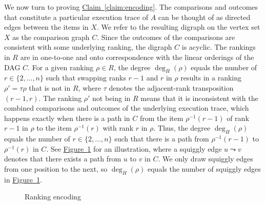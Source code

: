 \documentclass[11pt]{article}
\numberwithin{equation}{section}
\theoremstyle{definition}
\theoremstyle{plain}
\newcommand{\expref}[2]{\hyperref[#2]{#1~\ref{#2}}}
\newcommand{\ranking}{\rho}
\newcommand{\transposition}{\tau}
\begin{document}
We now turn to proving \expref{Claim}{claim:encoding}. The comparisons and outcomes that constitute a particular execution trace of $A$ can be thought of as directed edges between the items in $X$. We refer to the resulting digraph on the vertex set $X$ as the comparison graph $C$. Since the outcomes of the comparisons are consistent with some underlying ranking, the digraph $C$ is acyclic. The rankings in $R$ are in one-to-one and onto correspondence with the linear orderings of the DAG $C$. For a given ranking $\ranking \in R$, the degree $\deg_{\overline{H}}(\ranking)$ equals the number of $r \in \{2,\dots,n\}$ such that swapping ranks $r-1$ and $r$ in $\ranking$ results in a ranking $\ranking' = \transposition \ranking$ that is not in $R$, where $\transposition$ denotes the adjacent-rank transposition $(r-1,r)$. The ranking $\ranking'$ not being in $R$ means that it is inconsistent with the combined comparisons and outcomes of the underlying execution trace, which happens exactly when there is a path in $C$ from the item $\ranking^{-1}(r-1)$ of rank $r-1$ in $\ranking$ to the item $\ranking^{-1}(r)$ with rank $r$ in $\ranking$. Thus, the degree $\deg_{\overline{H}}(\ranking)$ equals the number of $r \in \{2,\dots,n\}$ such that there is a path from $\ranking^{-1}(r-1)$ to $\ranking^{-1}(r)$ in $C$. See \expref{Figure}{fig:encoding} for an illustration, where a squiggly edge $u \leadsto v$ denotes that there exists a path from $u$ to $v$ in $C$. We only draw squiggly edges from one position to the next, so $\deg_{\overline{H}}(\ranking)$ equals the number of squiggly edges in \expref{Figure}{fig:encoding}. 

\begin{figure}[ht]
    \centering
\caption{Ranking encoding}\label{fig:encoding}
\end{figure}
\end{document}
